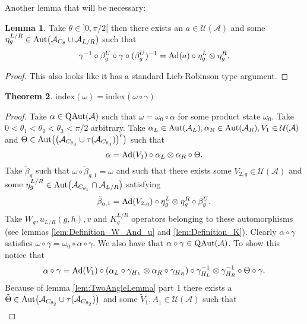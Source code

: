 \documentclass[12pt,a4paper,twoside]{article}
\let\originalleft\left
\let\originalright\right
\renewcommand{\left}{\mathopen{}\mathclose\bgroup\originalleft}
\renewcommand{\right}{\aftergroup\egroup\originalright}
\newcommand{\UU}{\mathcal U}
\renewcommand{\AA}{\mathcal A}
\newcommand{\Ad}[1]{\textrm{Ad}\left(#1\right)}
\newcommand{\Aut}[1]{\textrm{Aut}\left(#1\right)}
\newcommand{\QAut}[1]{\textrm{QAut}\left(#1\right)}
\theoremstyle{definition}
\newtheorem{theorem}{Theorem}[section]
\newtheorem{lemma}[theorem]{Lemma}
\numberwithin{equation}{section}
\begin{document}
Another lemma that will be necessary:
\begin{lemma}\label{lem:GroupActionInCone}
	Take $\theta\in]0,\pi/2[$ then there exists an $a\in\UU(\AA)$ and some $\eta_{g}^{L/R}\in\Aut{\AA_{C_{\theta}}\cup\AA_{L/R}}$ such that
	\begin{equation}
	\gamma^{-1}\circ\beta_g^U\circ\gamma\circ(\beta_g^U)^{-1}=\Ad{a}\circ\eta^L_g\otimes\eta^R_g.
	\end{equation}
\end{lemma}
\begin{proof}
	This also looks like it has a standard Lieb-Robinson type argument.
\end{proof}
\begin{theorem}
	$\textrm{index}(\omega)=\textrm{index}(\omega\circ\gamma)$
\end{theorem}
\begin{proof}
	Take $\alpha\in\QAut{\AA}$ such that $\omega=\omega_0\circ\alpha$ for some product state $\omega_0$. Take $0<\theta_1<\theta_2<\theta_3<\pi/2$ arbitrary. Take $\alpha_L\in\Aut{\AA_L},\alpha_R\in\Aut{\AA_R},V_1\in\UU(\AA)$ and $\Theta\in\Aut{\left(\AA_{C_{\theta_3}} \cup \tau(\AA_{C_{\theta_3}})\right)^c}$ such that
	\begin{equation}
	\alpha=\Ad{V_1}\circ\alpha_L\otimes\alpha_R\circ\Theta.
	\end{equation}
	Take $\tilde{\beta}_g$ such that $\omega\circ\tilde{\beta}_{g,1}=\omega$ and such that there exists some $V_{2,g}\in\UU(\AA)$ and some $\eta_g^{L/R}\in\Aut{\AA_{C_{\theta_1}}\cap\AA_{L/R}}$ satisfying
	\begin{equation}
		\tilde{\beta}_{g,1}=\Ad{V_{2,g}}\circ\eta_{g}^L\otimes\eta_{g}^R\circ\beta_g^U.
	\end{equation}
	Take $W_g,u_{L/R}(g,h),v$ and $K_g^{L/R}$ operators belonging to these automorphisms (see lemmas \ref{lem:Definition_W_And_u} and \ref{lem:Definition_K}). Clearly $\alpha\circ\gamma$ satisfies $\omega\circ\gamma=\omega_0\circ\alpha\circ\gamma$. We also have that $\alpha\circ\gamma\in\QAut{\AA}$. To show this notice that
	\begin{equation}
		\alpha\circ\gamma=\Ad{V_1}\circ(\alpha_L\circ\gamma_{H_L}\otimes\alpha_R\circ\gamma_{H_R})\circ\gamma_{H_L}^{-1}\otimes\gamma_{H_R}^{-1}\circ\Theta\circ\gamma.
	\end{equation}
	Because of lemma \ref{lem:TwoAngleLemma} part 1 there exists a $\tilde{\Theta}\in\Aut{\AA_{C_{\theta_2}}\cup\tau(\AA_{C_{\theta_2}})}$ and some $\tilde V_1,A_1\in\UU(\AA)$ such that
	\begin{align}

\end{align}
\end{proof}
\end{document}
